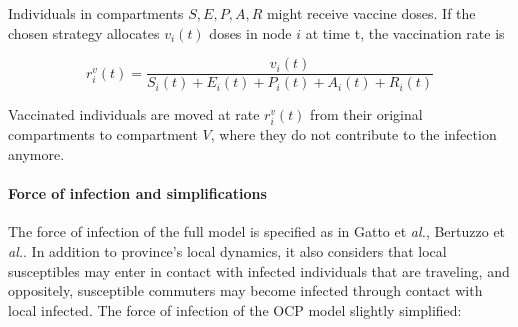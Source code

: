 Individuals in compartments $S, E, P, A, R$ might receive vaccine doses. If the chosen strategy allocates $v_{i}(t)$ doses in node $i$ at time t, the vaccination rate is

\begin{equation}
r^v_i(t) = \frac{v_{i}(t)}{S_i(t) +  E_i(t) + P_i(t) + A_i(t) + R_i(t)}
\end{equation}

Vaccinated individuals are moved at rate $r^v_i(t)$ from their original compartments to compartment $V$, where they do not contribute to the infection anymore.

\paragraph{Force of infection and simplifications}
The force of infection of the full model is specified as in Gatto et \textit{al.}\cite[-4\baselineskip]{Gatto:SpreadDynamicsCOVID19:2020}, Bertuzzo et \textit{al.}\cite{Bertuzzo:GeographyCOVID19Spread:2020}. In addition to province's local dynamics, it also considers that local susceptibles may enter in contact with infected individuals that are traveling, and oppositely, susceptible commuters may become infected through contact with local infected. The force of infection of the OCP model slightly simplified:


